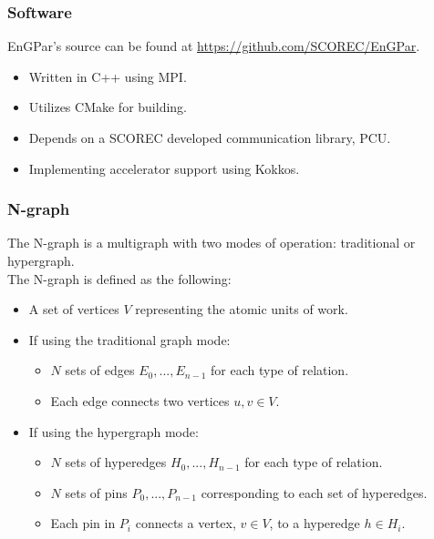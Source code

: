 \documentclass{beamer}
\begin{document}
\begin{frame}
  \frametitle{Software}
  EnGPar's source can be found at \url{https://github.com/SCOREC/EnGPar}.
  \begin{itemize}
  \item Written in C++ using MPI.
  \item Utilizes CMake for building.
  \item Depends on a SCOREC developed communication library, PCU.
  \item Implementing accelerator support using Kokkos.
  \end{itemize}
\end{frame}

\begin{frame}
  \frametitle{N-graph}
  The N-graph is a multigraph with two modes of operation: traditional or hypergraph.\\
  \smallskip
  The N-graph is defined as the following:
  \begin{itemize}
  \item A set of vertices $V$ representing the atomic units of work.
  \item If using the traditional graph mode:
    \begin{itemize}
    \item $N$ sets of edges $E_0,...,E_{n-1}$ for each type of relation.
    \item Each edge connects two vertices $u,v \in V$.
    \end{itemize}
  \item If using the hypergraph mode:
    \begin{itemize}
    \item $N$ sets of hyperedges $H_0,...,H_{n-1}$ for each type of relation.
    \item $N$ sets of pins $P_0,...,P_{n-1}$ corresponding to each set of hyperedges.
    \item Each pin in $P_i$ connects a vertex, $v \in V$, to a hyperedge $h \in H_i$.
    \end{itemize}
  \end{itemize}
\end{frame}
\end{document}

